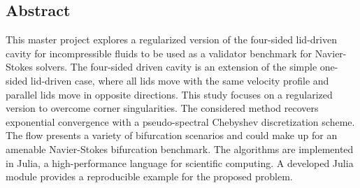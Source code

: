 
\begin{center}
\section*{Abstract}
\end{center} 

This master project explores a regularized version of the four-sided lid-driven
cavity for incompressible fluids to be used as a validator benchmark for
Navier-Stokes solvers. The four-sided driven cavity is an extension of the
simple one-sided lid-driven case, where all lids move with the same velocity
profile and parallel lids move in opposite directions. This study focuses on a
regularized version to overcome corner singularities. The considered method
recovers exponential convergence with a pseudo-spectral Chebyshev
discretization scheme. The flow presents a variety of bifurcation scenarios and
could make up for an amenable Navier-Stokes bifurcation benchmark. The
algorithms are implemented in Julia, a high-performance language for scientific
computing. A developed Julia module provides a reproducible example for the
proposed problem.

